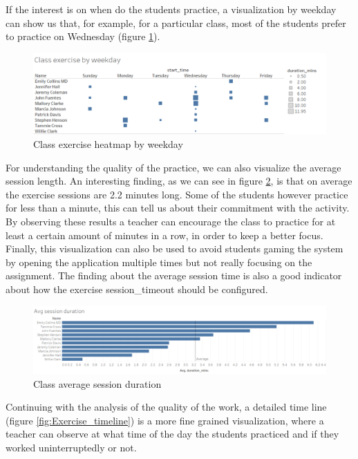 If the interest is on when do the students practice, a visualization by weekday can show us that, for example, for a particular class, most of the students prefer to practice on Wednesday (figure \ref{fig:Class_exercise_by_weekday}).

\begin{figure}[bth]
	\centering
	\includegraphics[width=1\linewidth]{gfx/Class_exercise_by_weekday}
	\caption{Class exercise heatmap by weekday}
	\label{fig:Class_exercise_by_weekday}
\end{figure}

For understanding the quality of the practice, we can also visualize the average session length. An interesting finding, as we can see in figure \ref{fig:Avg_exercise_session_duration}, is that on average the exercise sessions are 2.2 minutes long. Some of the students however practice for less than a minute, this can tell us about their commitment with the activity. By observing these results a teacher can encourage the class to practice for at least a certain amount of minutes in a row, in order to keep a better focus. Finally, this visualization can also be used to avoid students gaming the system by opening the application multiple times but not really focusing on the assignment.
The finding about the average session time is also a good indicator about how the exercise session\_timeout should be configured.

\begin{figure}[bth]
	\centering
	\includegraphics[width=1\linewidth]{gfx/Avg_exercise_session_duration}
	\caption{Class average session duration}
	\label{fig:Avg_exercise_session_duration}
\end{figure}

Continuing with the analysis of the quality of the work, a detailed time line (figure \ref{fig:Exercise_timeline}) is a more fine grained visualization, where a teacher can observe at what time of the day the students practiced and if they worked uninterruptedly or not.


